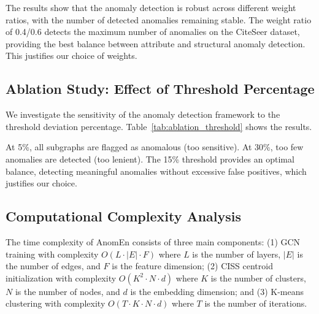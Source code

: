 \documentclass[10pt,twocolumn,a4paper]{article}
\begin{document}
The results show that the anomaly detection is robust across different weight ratios, with the number of detected anomalies remaining stable. The weight ratio of 0.4/0.6 detects the maximum number of anomalies on the CiteSeer dataset, providing the best balance between attribute and structural anomaly detection. This justifies our choice of weights.

\subsection{Ablation Study: Effect of Threshold Percentage}

We investigate the sensitivity of the anomaly detection framework to the threshold deviation percentage. Table~\ref{tab:ablation_threshold} shows the results.

\begin{table}[ht]
\centering
\caption{Effect of Threshold Deviation Percentage on Anomaly Detection}
\label{tab:ablation_threshold}
\end{table}

At 5\%, all subgraphs are flagged as anomalous (too sensitive). At 30\%, too few anomalies are detected (too lenient). The 15\% threshold provides an optimal balance, detecting meaningful anomalies without excessive false positives, which justifies our choice.

\subsection{Computational Complexity Analysis}

The time complexity of AnomEn consists of three main components: (1) GCN training with complexity $O(L \cdot |E| \cdot F)$ where $L$ is the number of layers, $|E|$ is the number of edges, and $F$ is the feature dimension; (2) CISS centroid initialization with complexity $O(K^2 \cdot N \cdot d)$ where $K$ is the number of clusters, $N$ is the number of nodes, and $d$ is the embedding dimension; and (3) K-means clustering with complexity $O(T \cdot K \cdot N \cdot d)$ where $T$ is the number of iterations.
\end{document}
